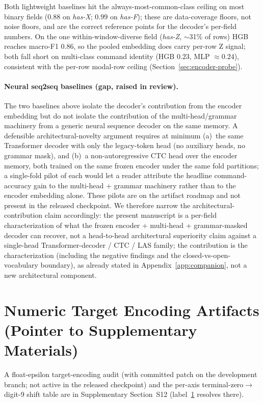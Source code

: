 \documentclass[sensors,article,submit,moreauthors,pdftex]{Definitions/mdpi}
\begin{document}
Both lightweight baselines hit the always-most-common-class ceiling on most binary fields ($0.88$ on \emph{has-X}; $0.99$ on \emph{has-F}); these are data-coverage floors, not noise floors, and are the correct reference points for the decoder's per-field numbers. On the one within-window-diverse field (\emph{has-Z}, $\sim$31\% of rows) HGB reaches macro-F1 $0.86$, so the pooled embedding does carry per-row Z signal; both fall short on multi-class command identity (HGB $0.23$, MLP $\approx0.24$), consistent with the per-row modal-row ceiling (Section~\ref{sec:encoder-probe}).

\paragraph{Neural seq2seq baselines (gap, raised in review).} The two baselines above isolate the decoder's contribution from the encoder embedding but do not isolate the contribution of the multi-head/grammar machinery from a generic neural sequence decoder on the same memory. A defensible architectural-novelty argument requires at minimum (a)~the same Transformer decoder with only the legacy-token head (no auxiliary heads, no grammar mask), and (b)~a non-autoregressive CTC head over the encoder memory, both trained on the same frozen encoder under the same fold partitions; a single-fold pilot of each would let a reader attribute the headline command-accuracy gain to the multi-head + grammar machinery rather than to the encoder embedding alone. These pilots are on the artifact roadmap and not present in the released checkpoint. We therefore narrow the architectural-contribution claim accordingly: the present manuscript is a per-field characterization of what the frozen encoder + multi-head + grammar-masked decoder can recover, not a head-to-head architectural superiority claim against a single-head Transformer-decoder / CTC / LAS family; the contribution is the characterization (including the negative findings and the closed-vs-open-vocabulary boundary), as already stated in Appendix~\ref{app:companion}, not a new architectural component.

\clearpage
\section{Numeric Target Encoding Artifacts (Pointer to Supplementary Materials)}
\label{app:digit_encoding}

A float-epsilon target-encoding audit (with committed patch on the development branch; not active in the released checkpoint) and the per-axis terminal-zero$\to$digit-9 shift table are in Supplementary Section~S12 (label~\ref{app:digit_encoding} resolves there).
\end{document}

